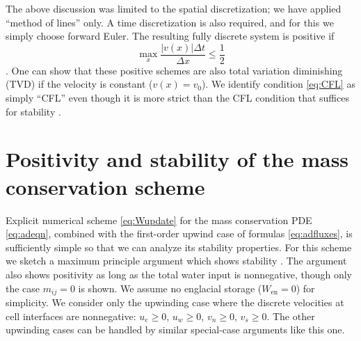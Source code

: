 \documentclass[11pt,final]{amsart}
\newcommand{\Wen}{W_{\text{en}}}
\begin{document}
The above discussion was limited to the spatial discretization; we have applied ``method of lines'' only.  A time discretization is also required, and for this we simply choose forward Euler.  The resulting fully discrete system is positive if
\begin{equation}
\max_x \frac{|v(x)|\Delta t}{\Delta x} \le \frac{1}{2} \label{eq:CFL}
\end{equation}
\citep[section III.1.1]{HundsdorferVerwer2010}.  One can show that these positive schemes are also total variation diminishing (TVD) if the velocity is constant ($v(x)=v_0$).  We identify condition \eqref{eq:CFL} as simply ``CFL'' even though it is more strict than the CFL condition that suffices for stability \citep{MortonMayers}.


\section{Positivity and stability of the mass conservation scheme} \label{app:positivestable}

Explicit numerical scheme \eqref{eq:Wupdate} for the mass conservation PDE \eqref{eq:adeqn}, combined with the first-order upwind case of formulas \eqref{eq:adfluxes}, is sufficiently simple so that we can analyze its stability properties.  For this scheme we sketch a maximum principle argument which shows stability \citep{MortonMayers}.  The argument also shows positivity \citep{HundsdorferVerwer2010} as long as the total water input is nonnegative, though only the case $m_{ij} = 0$ is shown.  We assume no englacial storage ($\Wen=0$) for simplicity.  We consider only the upwinding case where the discrete velocities at cell interfaces are nonnegative: $u_e\ge 0$, $u_w\ge 0$, $v_n\ge 0$, $v_s\ge 0$.  The other upwinding cases can be handled by similar special-case arguments like this one.
\end{document}
